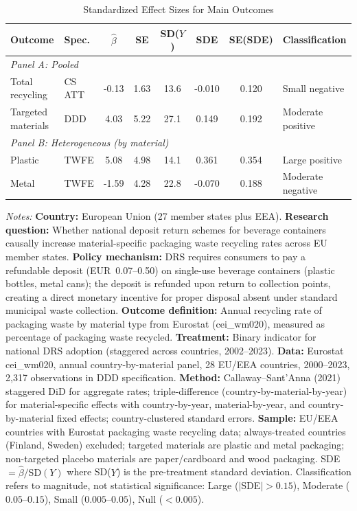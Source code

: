 \begin{table}[H]
\centering
\caption{Standardized Effect Sizes for Main Outcomes}
\label{tab:sde}
\begin{threeparttable}
\small
\begin{tabular}{llcccccl}
\toprule
Outcome & Spec. & $\hat{\beta}$ & SE & SD($Y$) & SDE & SE(SDE) & Classification \\
\midrule
\multicolumn{8}{l}{\textit{Panel A: Pooled}} \\
Total recycling & CS ATT & -0.13 & 1.63 & 13.6 & -0.010 & 0.120 & Small negative \\
Targeted materials & DDD & 4.03 & 5.22 & 27.1 & 0.149 & 0.192 & Moderate positive \\
\midrule
\multicolumn{8}{l}{\textit{Panel B: Heterogeneous (by material)}} \\
Plastic & TWFE & 5.08 & 4.98 & 14.1 & 0.361 & 0.354 & Large positive \\
Metal & TWFE & -1.59 & 4.28 & 22.8 & -0.070 & 0.188 & Moderate negative \\
\bottomrule
\end{tabular}
\begin{tablenotes}[flushleft]\footnotesize
\item \textit{Notes:} \textbf{Country:} European Union (27 member states plus EEA).
\textbf{Research question:} Whether national deposit return schemes for beverage containers causally increase material-specific packaging waste recycling rates across EU member states.
\textbf{Policy mechanism:} DRS requires consumers to pay a refundable deposit (EUR~0.07--0.50) on single-use beverage containers (plastic bottles, metal cans); the deposit is refunded upon return to collection points, creating a direct monetary incentive for proper disposal absent under standard municipal waste collection.
\textbf{Outcome definition:} Annual recycling rate of packaging waste by material type from Eurostat (cei\_wm020), measured as percentage of packaging waste recycled.
\textbf{Treatment:} Binary indicator for national DRS adoption (staggered across countries, 2002--2023).
\textbf{Data:} Eurostat cei\_wm020, annual country-by-material panel, 28 EU/EEA countries, 2000--2023, 2,317 observations in DDD specification.
\textbf{Method:} Callaway--Sant'Anna (2021) staggered DiD for aggregate rates; triple-difference (country-by-material-by-year) for material-specific effects with country-by-year, material-by-year, and country-by-material fixed effects; country-clustered standard errors.
\textbf{Sample:} EU/EEA countries with Eurostat packaging waste recycling data; always-treated countries (Finland, Sweden) excluded; targeted materials are plastic and metal packaging; non-targeted placebo materials are paper/cardboard and wood packaging.
SDE $= \hat{\beta} / \text{SD}(Y)$ where SD($Y$) is the pre-treatment standard deviation.
Classification refers to magnitude, not statistical significance: Large ($|$SDE$| > 0.15$), Moderate ($0.05$--$0.15$), Small ($0.005$--$0.05$), Null ($< 0.005$).
\end{tablenotes}
\end{threeparttable}
\end{table}
